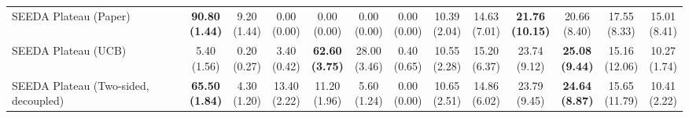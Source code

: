 \begin{table}[H]
{\begin{tabular}{l|cccccc|cccccc}
SEEDA Plateau (Paper) & \bfseries \makecell{90.80 \\ (1.44)} & \makecell{9.20 \\ (1.44)} & {\cellcolor[HTML]{C8E6C9}} \makecell{0.00 \\ (0.00)} & \makecell{0.00 \\ (0.00)} & \makecell{0.00 \\ (0.00)} & \makecell{0.00 \\ (0.00)} & \makecell{10.39 \\ (2.04)} & \makecell{14.63 \\ (7.01)} & {\cellcolor[HTML]{C8E6C9}} \bfseries \makecell{21.76 \\ (10.15)} & \makecell{20.66 \\ (8.40)} & \makecell{17.55 \\ (8.33)} & \makecell{15.01 \\ (8.41)} \\
SEEDA Plateau (UCB) & \makecell{5.40 \\ (1.56)} & \makecell{0.20 \\ (0.27)} & {\cellcolor[HTML]{C8E6C9}} \makecell{3.40 \\ (0.42)} & \bfseries \makecell{62.60 \\ (3.75)} & \makecell{28.00 \\ (3.46)} & \makecell{0.40 \\ (0.65)} & \makecell{10.55 \\ (2.28)} & \makecell{15.20 \\ (6.37)} & {\cellcolor[HTML]{C8E6C9}} \makecell{23.74 \\ (9.12)} & \bfseries \makecell{25.08 \\ (9.44)} & \makecell{15.16 \\ (12.06)} & \makecell{10.27 \\ (1.74)} \\
SEEDA Plateau (Two-sided, decoupled) & \bfseries \makecell{65.50 \\ (1.84)} & \makecell{4.30 \\ (1.20)} & {\cellcolor[HTML]{C8E6C9}} \makecell{13.40 \\ (2.22)} & \makecell{11.20 \\ (1.96)} & \makecell{5.60 \\ (1.24)} & \makecell{0.00 \\ (0.00)} & \makecell{10.65 \\ (2.51)} & \makecell{14.86 \\ (6.02)} & {\cellcolor[HTML]{C8E6C9}} \makecell{23.79 \\ (9.45)} & \bfseries \makecell{24.64 \\ (8.87)} & \makecell{15.65 \\ (11.79)} & \makecell{10.41 \\ (2.22)} \\

\end{tabular}}
\end{table}
